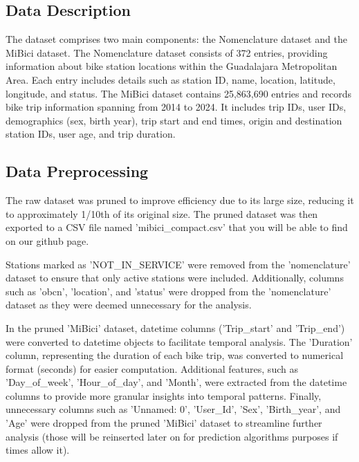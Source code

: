 \documentclass[conference]{IEEEtran}
\begin{document}
\subsection{Data Description}
The dataset comprises two main components: the Nomenclature dataset and the MiBici dataset. The Nomenclature dataset consists of 372 entries, providing information about bike station locations within the Guadalajara Metropolitan Area. Each entry includes details such as station ID, name, location, latitude, longitude, and status. The MiBici dataset contains 25,863,690 entries and records bike trip information spanning from 2014 to 2024. It includes trip IDs, user IDs, demographics (sex, birth year), trip start and end times, origin and destination station IDs, user age, and trip duration.

\subsection{Data Preprocessing}
The raw dataset was pruned to improve efficiency due to its large size, reducing it to approximately 1/10th of its original size. The pruned dataset was then exported to a CSV file named 'mibici\_compact.csv' that you will be able to find on our github page.

Stations marked as 'NOT\_IN\_SERVICE' were removed from the 'nomenclature' dataset to ensure that only active stations were included. Additionally, columns such as 'obcn', 'location', and 'status' were dropped from the 'nomenclature' dataset as they were deemed unnecessary for the analysis.

In the pruned 'MiBici' dataset, datetime columns ('Trip\_start' and 'Trip\_end') were converted to datetime objects to facilitate temporal analysis. The 'Duration' column, representing the duration of each bike trip, was converted to numerical format (seconds) for easier computation. Additional features, such as 'Day\_of\_week', 'Hour\_of\_day', and 'Month', were extracted from the datetime columns to provide more granular insights into temporal patterns. Finally, unnecessary columns such as 'Unnamed: 0', 'User\_Id', 'Sex', 'Birth\_year', and 'Age' were dropped from the pruned 'MiBici' dataset to streamline further analysis (those will be reinserted later on for prediction algorithms purposes if times allow it).
\end{document}
